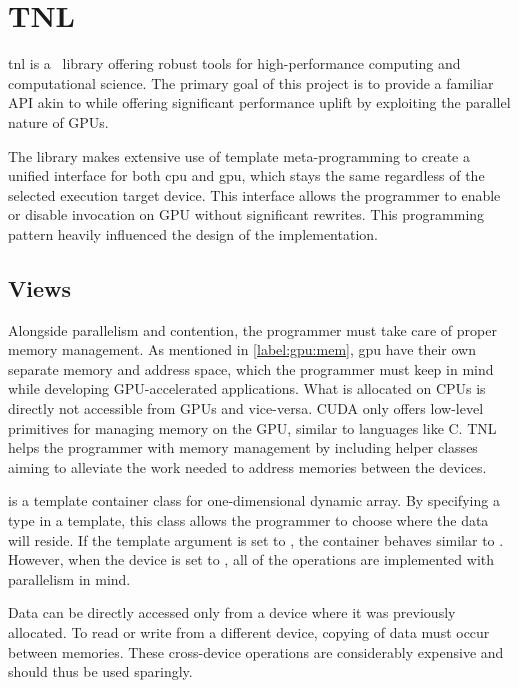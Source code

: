 \section{TNL}

\acrfull{tnl} \cite{tnl} is a \CC\ library offering robust tools for high-performance computing and computational science. The primary goal of this project is to provide a familiar API akin to  while offering significant performance uplift by exploiting the parallel nature of GPUs.

The library makes extensive use of template meta-programming to create a unified interface for both \acrshort{cpu} and \acrshort{gpu}, which stays the same regardless of the selected execution target device. This interface allows the programmer to enable or disable invocation on GPU without significant rewrites. This programming pattern heavily influenced the design of the implementation.

\subsection{Views}

Alongside parallelism and contention, the programmer must take care of proper memory management. As mentioned in \cref{label:gpu:mem}, \acrshort{gpu} have their own separate memory and address space, which the programmer must keep in mind while developing GPU-accelerated applications. What is allocated on CPUs is directly not accessible from GPUs and vice-versa. CUDA only offers low-level primitives for managing memory on the GPU, similar to languages like C. TNL helps the programmer with memory management by including helper classes aiming to alleviate the work needed to address memories between the devices.

 is a template container class for one-dimensional dynamic array. By specifying a type in a template, this class allows the programmer to choose where the data will reside. If the template argument is set to , the container behaves similar to . However, when the device is set to , all of the operations are implemented with parallelism in mind.

Data can be directly accessed only from a device where it was previously allocated. To read or write from a different device, copying of data must occur between memories. These cross-device operations are considerably expensive and should thus be used sparingly.

